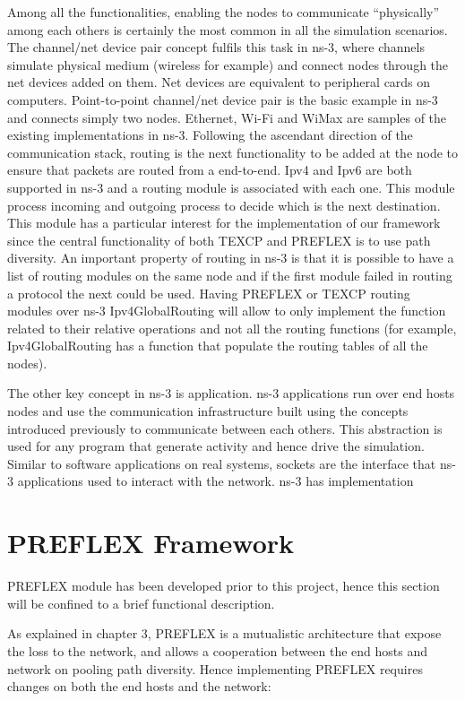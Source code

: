 Among all the functionalities, enabling the nodes to communicate “physically” among each others is certainly the most common in all the simulation scenarios. The channel/net device pair concept fulfils this task in ns-3, where channels simulate physical medium (wireless for example) and connect nodes through the net devices added on them. Net devices are equivalent to peripheral cards on computers. Point-to-point channel/net device pair is the basic example in ns-3 and connects simply two nodes. Ethernet, Wi-Fi and WiMax are samples of the existing implementations in ns-3. Following the ascendant direction of the communication stack, routing is the next functionality to be added at the node to ensure that packets are routed from a end-to-end. Ipv4 and Ipv6 are both supported in ns-3 and a routing module is associated with each one. This module process incoming and outgoing process to decide which is the next destination. This module has a particular interest for the implementation of our framework since the central functionality of both TEXCP and PREFLEX is to use path diversity. An important property of routing in ns-3 is that it is possible to have a list of routing modules on the same node and if the first module failed in routing a protocol the next could be used. Having PREFLEX or TEXCP routing modules over ns-3 Ipv4GlobalRouting will allow to only implement the function related to their relative operations and not all the routing functions (for example, Ipv4GlobalRouting has a function that populate the routing tables of all the nodes).  

The other key concept in ns-3 is application. ns-3 applications run over end hosts nodes and use the communication infrastructure built using the concepts introduced previously to communicate between each others. This abstraction is used for any program that generate activity and hence drive the simulation. Similar to software applications on real systems, sockets are the interface that ns-3 applications used to interact with the network. ns-3 has implementation 
 
\section{PREFLEX Framework}
PREFLEX module has been developed prior to this project, hence this section will be confined to a brief functional description.

As explained in chapter 3, PREFLEX is a mutualistic architecture that expose the loss to the network, and allows a cooperation between the end hosts and network on pooling path diversity. Hence implementing PREFLEX requires changes on both the end hosts and the network: 

